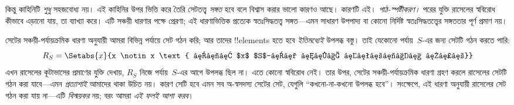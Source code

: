 \documentclass[../../../include/open-logic-section]{subfiles}
\begin{document}
কিন্তু কাহিনিটি \emph{শুধু} সহজবোধ্য নয়। এই কাহিনির উপর
ভিত্তি করে তৈরি সেটতত্ত্ব \emph{সঙ্গত} হবে বলে বিশ্বাস করার
ভালো কারণও আছে। কারণটি এই।
\emph{পাঠ-স্পষ্টীকরণ।} পরের যুক্তি রাসেলের স্ববিরোধ কীভাবে
এড়ানো যায়, তা ব্যাখ্যা করে। এটি সঞ্চয়ী ধারণার পক্ষে প্রেরণা;
এই ধারণাভিত্তিক প্রত্যেক স্বতঃসিদ্ধতত্ত্ব সঙ্গত—এমন সাধারণ
উপপাদ্য বা কোনো নির্দিষ্ট স্বতঃসিদ্ধতত্ত্বের সঙ্গততার পূর্ণ প্রমাণ নয়।

সেটের সঞ্চয়ী-পর্যায়ক্রমিক ধারণা অনুযায়ী আমরা বিভিন্ন
পর্যায়ে সেট গঠন করি; আর তাদের !!{element}s হতে হবে
\emph{ইতিমধ্যেই} উপলব্ধ বস্তু। তাই যেকোনো পর্যায়~$S$-এর
জন্য সেটটি গঠন করতে পারি:
\[
  R_S = \Setabs{x}{x \notin x \text{ এবং $x$ $S$-এর আগে উপলব্ধ ছিল}}
\]
এখন রাসেলের কূটাভাসের প্রমাণের যুক্তি দেখায়, $R_S$ নিজে
পর্যায়~$S$-এর আগে উপলব্ধ ছিল না। এতে কোনো স্ববিরোধ নেই।
তার উপর, সেটের সঞ্চয়ী-পর্যায়ক্রমিক ধারণা গ্রহণ করলে
রাসেলের সেটটি গঠন করা যাবে—এমন \emph{প্রত্যাশাই} আমাদের
থাকা উচিত নয়। কারণ সেটি হবে এমন সব অ-স্বসদস্য সেটের
সেট, যেগুলি ``কখনো-না-কখনো উপলব্ধ হবে''। সংক্ষেপে,
এই ধারণা অনুযায়ী রাসেলের সেট গঠন করা যায় না—এটি
\emph{বিস্ময়কর} নয়; বরং আমরা \emph{এই ফলই আশা করব}।

%

\end{document}
